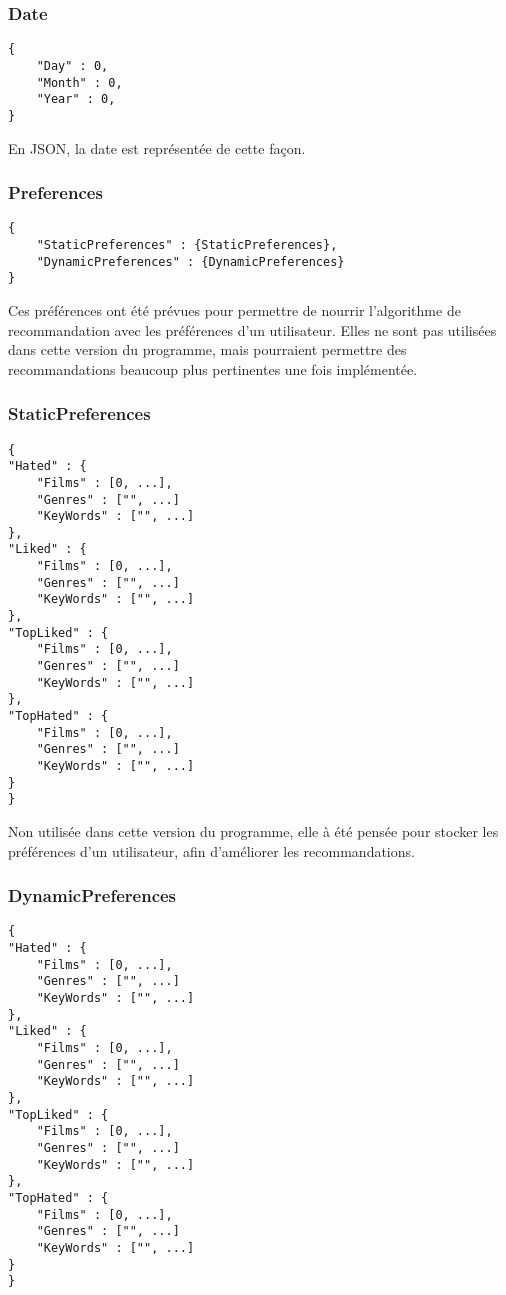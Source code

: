 \subsubsection{Date}
\begin{lstlisting}
{
	"Day" : 0,
	"Month" : 0,
	"Year" : 0,
}
\end{lstlisting}
En JSON, la date est représentée de cette façon.

\subsubsection{Preferences}

\begin{lstlisting}
{
	"StaticPreferences" : {StaticPreferences},
	"DynamicPreferences" : {DynamicPreferences}
}
\end{lstlisting}
Ces préférences ont été prévues pour permettre de nourrir l'algorithme de recommandation avec les préférences d'un utilisateur.
Elles ne sont pas utilisées dans cette version du programme, mais pourraient permettre des recommandations beaucoup plus pertinentes une fois implémentée.


\subsubsection{StaticPreferences}

\begin{lstlisting}
{
"Hated" : {
	"Films" : [0, ...],
	"Genres" : ["", ...]
	"KeyWords" : ["", ...]
},
"Liked" : {
	"Films" : [0, ...],
	"Genres" : ["", ...]
	"KeyWords" : ["", ...]
},
"TopLiked" : {
	"Films" : [0, ...],
	"Genres" : ["", ...]
	"KeyWords" : ["", ...]
},
"TopHated" : {
	"Films" : [0, ...],
	"Genres" : ["", ...]
	"KeyWords" : ["", ...]
}
}
\end{lstlisting}
Non utilisée dans cette version du programme, elle à été pensée pour stocker les préférences d'un utilisateur, afin d'améliorer les recommandations.
\subsubsection{DynamicPreferences}

\begin{lstlisting}
{
"Hated" : {
	"Films" : [0, ...],
	"Genres" : ["", ...]
	"KeyWords" : ["", ...]
},
"Liked" : {
	"Films" : [0, ...],
	"Genres" : ["", ...]
	"KeyWords" : ["", ...]
},
"TopLiked" : {
	"Films" : [0, ...],
	"Genres" : ["", ...]
	"KeyWords" : ["", ...]
},
"TopHated" : {
	"Films" : [0, ...],
	"Genres" : ["", ...]
	"KeyWords" : ["", ...]
}
}
\end{lstlisting}

